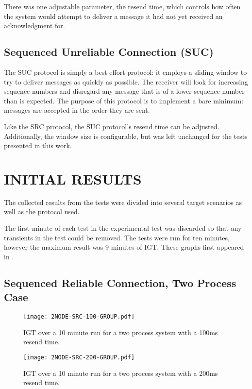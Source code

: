 There was one adjustable parameter, the resend time, which controls how often the system would attempt to deliver a message it had not yet received an acknowledgment for.

\subsection{Sequenced Unreliable Connection (SUC)}

The \ac{SUC} protocol is simply a best effort protocol: it employs a sliding window to try to deliver messages as quickly as possible.
The receiver will look for increasing sequence numbers and disregard any message that is of a lower sequence number than is expected. The purpose of this protocol is to implement a bare minimum: messages are accepted in the order they are sent.

Like the \ac{SRC} protocol, the SUC protocol's resend time can be adjusted. Additionally, the window size is configurable, but was left unchanged for the tests presented in this work.

\section{INITIAL RESULTS}

The collected results from the tests were divided into several target scenarios as well as the protocol used.

The first minute of each test in the experimental test was discarded so that any transients in the test could be removed.
The tests were run for ten minutes, however the maximum result was 9 minutes of \ac{IGT}.
These graphs first appeared in \cite{CRITIS2012}.

\subsection{Sequenced Reliable Connection, Two Process Case}

\begin{figure}
    \centering
    \texttt{[image: 2NODE-SRC-100-GROUP.pdf]}
    \caption{\ac{IGT} over a 10 minute run for a two process system with a 100ms resend time.}
    \label{fig:IGT-SRC-2NODE-100}
\end{figure}

\begin{figure}
    \centering
    \texttt{[image: 2NODE-SRC-200-GROUP.pdf]}
    \caption{\ac{IGT} over a 10 minute run for a two process system with a 200ms resend time.}
    \label{fig:IGT-SRC-2NODE-200}
\end{figure}

